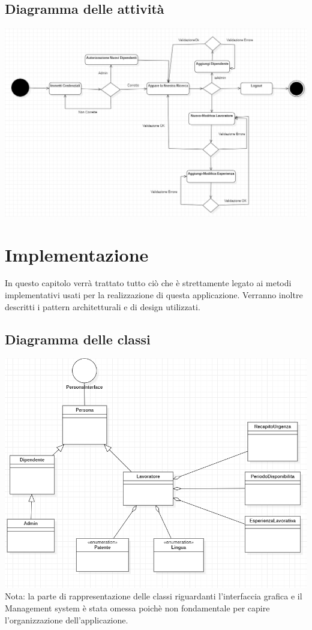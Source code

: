\documentclass[ 4paper,11pt,openany]{book}
\begin{document}
\section{Diagramma delle attività}
\includegraphics[width=185mm]{attivita.png}


\chapter{Implementazione}%
In questo capitolo verrà trattato tutto ciò che è strettamente legato ai metodi implementativi usati per la realizzazione di questa applicazione. Verranno inoltre descritti i pattern architetturali e di design utilizzati.
\section{Diagramma delle classi}
\includegraphics[width=185mm]{classi.png}
Nota: la parte di rappresentazione delle classi riguardanti l'interfaccia grafica e il Management system è stata omessa poichè non fondamentale per capire l'organizzazione dell'applicazione.
\end{document}
